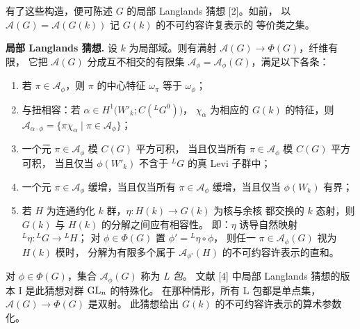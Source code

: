 有了这些构造，便可陈述 $G$ 的局部 Langlands 猜想 [2]。如前，
以 $\mathcal{A}(G)=\mathcal{A}(G(k))$ 记 $G(k)$ 的不可约容许复表示的
等价类之集。

\par\medskip\noindent\textbf{局部 Langlands 猜想.}\quad
设 $k$ 为局部域。则有满射 $\mathcal{A}(G)\to\Phi(G)$，纤维有限，
它把 $\mathcal{A}(G)$ 分成互不相交的有限集
$\mathcal{A}_\phi=\mathcal{A}_\phi(G)$，满足以下各条：
\begin{enumerate}[label=(\roman*),leftmargin=*]
  \item 若 $\pi\in\mathcal{A}_\phi$，则 $\pi$ 的中心特征 $\omega_\pi$
    等于 $\omega_\phi$；
  \item 与扭相容：若 $\alpha\in H^{1}\bigl(W'_k;C({}^{L}G^{0})\bigr)$，
    $\chi_\alpha$ 为相应的 $G(k)$ 的特征，则
    $\mathcal{A}_{\alpha\cdot\phi}=\{\pi\chi_\alpha\mid\pi\in\mathcal{A}_\phi\}$；
  \item 一个元 $\pi\in\mathcal{A}_\phi$ 模 $C(G)$ 平方可积，
    当且仅当所有 $\pi\in\mathcal{A}_\phi$ 模 $C(G)$ 平方可积，
    当且仅当 $\phi(W'_k)$ 不含于 ${}^{L}G$ 的真 Levi 子群中；
  \item 一个元 $\pi\in\mathcal{A}_\phi$ 缓增，当且仅当所有
    $\pi\in\mathcal{A}_\phi$ 缓增，当且仅当 $\phi(W_k)$ 有界；
  \item 若 $H$ 为连通约化 $k$ 群，$\eta\colon H(k)\to G(k)$ 为核与余核
    都交换的 $k$ 态射，则 $G(k)$ 与 $H(k)$ 的分解之间应有相容性。
    即：$\eta$ 诱导自然映射 ${}^{L}\eta\colon{}^{L}G\to{}^{L}H$；
    对 $\phi\in\Phi(G)$ 置 $\phi'={}^{L}\eta\circ\phi$，
    则任一 $\pi\in\mathcal{A}_\phi(G)$ 视为 $H(k)$ 模时，
    分解为有限多个属于 $\mathcal{A}_{\phi'}(H)$ 的不可约容许表示的直和。
\end{enumerate}

对 $\phi\in\Phi(G)$，集合 $\mathcal{A}_\phi(G)$ 称为 \emph{L 包}。
文献 [4] 中局部 Langlands 猜想的版本 I 是此猜想对群 $\mathrm{GL}_n$ 的特殊化。
在那种情形，所有 L 包都是单点集，$\mathcal{A}(G)\to\Phi(G)$ 是双射。
此猜想给出 $G(k)$ 的不可约容许表示的算术参数化。

